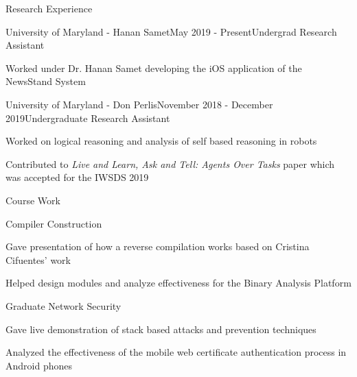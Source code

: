 \documentclass{resume} %
\begin{document}


\begin{rSection}{Research Experience}

\begin{rSubsection}{University of Maryland - Hanan Samet}{May 2019 - Present}{Undergrad Research Assistant}{}
\item Worked under Dr. Hanan Samet developing the iOS application of the NewsStand System
\end{rSubsection}

\begin{rSubsection}{University of Maryland - Don Perlis}{November 2018 - December 2019}{Undergraduate Research Assistant}{}
\item Worked on logical reasoning and analysis of self based reasoning in robots
\item Contributed to \textit{Live and Learn, Ask and Tell: Agents Over Tasks} paper which was accepted for the IWSDS 2019
\end{rSubsection}

\end{rSection}



\begin{rSection}{Course Work}

\begin{rSubsection}{Compiler Construction}{}{}{}
\item Gave presentation of how a reverse compilation works based on  Cristina Cifuentes' work
\item Helped design modules and analyze effectiveness for the Binary Analysis Platform
\end{rSubsection}

\begin{rSubsection}{Graduate Network Security}{}{}{}
\item Gave live demonstration of stack based attacks and prevention techniques
\item Analyzed the effectiveness of the mobile web certificate authentication process in Android phones
\end{rSubsection}

\end{rSection}
\end{document}
